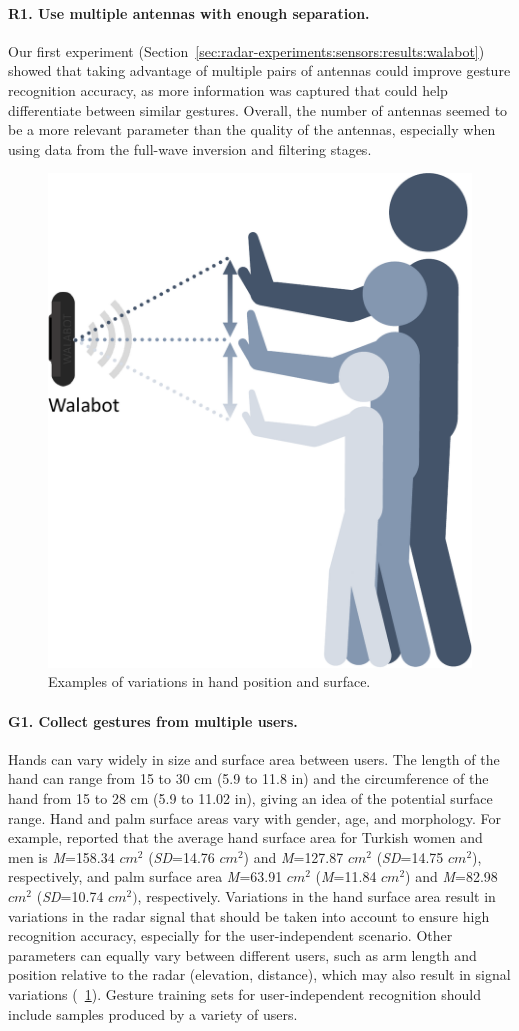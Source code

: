 \paragraph{R1. Use multiple antennas with enough separation.}
Our first experiment (Section~\ref{sec:radar-experiments:sensors:results:walabot}) showed that taking advantage of multiple pairs of antennas could improve gesture recognition accuracy, as more information was captured that could help differentiate between similar gestures. Overall, the number of antennas seemed to be a more relevant parameter than the quality of the antennas, especially when using data from the full-wave inversion and filtering stages. 

\begin{figure}
    \centering
    \includegraphics[width=.4\linewidth]{Figures/RadarExperiments/Discussion/pipeline-limitations-size.pdf}
    \caption{Examples of variations in hand position and surface.}
    \label{fig:radar-experiments:discussion:elevation}
\end{figure}

\paragraph{G1. Collect gestures from multiple users.}
Hands can vary widely in size and surface area between users. The length of the hand can range from 15 to 30 cm (5.9 to 11.8 in) and the circumference of the hand from 15 to 28 cm (5.9 to 11.02 in), giving an idea of the potential surface range. Hand and palm surface areas vary with gender, age, and morphology. For example, \cite{Goker:2017} reported that the average hand surface area for Turkish women and men is \textit{M}{=}158.34 $cm^2$ (\textit{SD}{=}14.76 $cm^2$) and \textit{M}{=}127.87 $cm^2$ (\textit{SD}{=}14.75 $cm^2$), respectively, and palm surface area \textit{M}{=}63.91 $cm^2$ (\textit{M}{=}11.84 $cm^2$) and \textit{M}{=}82.98 $cm^2$ (\textit{SD}{=}10.74 $cm^2)$, respectively. 
Variations in the hand surface area result in variations in the radar signal that should be taken into account to ensure high recognition accuracy, especially for the user-independent scenario. Other parameters can equally vary between different users, such as arm length and position relative to the radar (\eg elevation, distance), which may also result in signal variations (\fig~\ref{fig:radar-experiments:discussion:elevation}). Gesture training sets for user-independent recognition should include samples produced by a variety of users.

